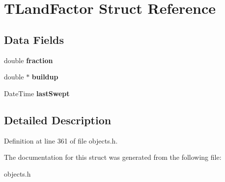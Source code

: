 \hypertarget{struct_t_land_factor}{}\section{T\+Land\+Factor Struct Reference}
\label{struct_t_land_factor}
\subsection*{Data Fields}
\begin{DoxyCompactItemize}
\item 
\mbox{\label{struct_t_land_factor_a4f43290fb7c227c99bac275f57c87857}} 
double {\bfseries fraction}
\item 
\mbox{\label{struct_t_land_factor_aed21cba5acb0fd62c9aefc9c94f86796}} 
double $\ast$ {\bfseries buildup}
\item 
\mbox{\label{struct_t_land_factor_a8f73ffbf3b3c21446540c59bbe002e19}} 
Date\+Time {\bfseries last\+Swept}
\end{DoxyCompactItemize}


\subsection{Detailed Description}


Definition at line 361 of file objects.\+h.



The documentation for this struct was generated from the following file\+:\begin{DoxyCompactItemize}
\item 
objects.\+h\end{DoxyCompactItemize}

